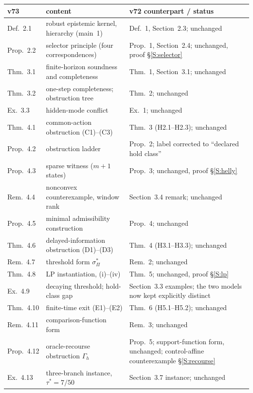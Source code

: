 \documentclass[11pt,a4paper]{article}
\theoremstyle{plain}
\theoremstyle{definition}
\theoremstyle{remark}
\newcommand{\hyp}[1]{\textup{(#1)}}
\begin{document}
\begin{table}[htbp]
\centering\small
\begin{tabularx}{\textwidth}{@{}l>{\raggedright\arraybackslash}X>{\raggedright\arraybackslash}X@{}}
\toprule
v73 & content & v72 counterpart / status\\
\midrule
Def.~2.1 & robust epistemic kernel, hierarchy (main~1) & Def.~1, Section~2.3; unchanged\\
Prop.~2.2 & selector principle (four correspondences) & Prop.~1, Section~2.4; unchanged, proof \S\ref{S:selector}\\
Thm.~3.1 & finite-horizon soundness and completeness & Thm.~1, Section~3.1; unchanged\\
Thm.~3.2 & one-step completeness; obstruction tree & Thm.~2; unchanged\\
Ex.~3.3 & hidden-mode conflict & Ex.~1; unchanged\\
Thm.~4.1 & common-action obstruction \hyp{C1}--\hyp{C3} & Thm.~3 (H2.1--H2.3); unchanged\\
Prop.~4.2 & obstruction ladder & Prop.~2; label corrected to ``declared hold class''\\
Prop.~4.3 & sparse witness ($m{+}1$ states) & Prop.~3; unchanged, proof \S\ref{S:helly}\\
Rem.~4.4 & nonconvex counterexample, window rank & Section~3.4 remark; unchanged\\
Prop.~4.5 & minimal admissibility construction & Prop.~4; unchanged\\
Thm.~4.6 & delayed-information obstruction \hyp{D1}--\hyp{D3} & Thm.~4 (H3.1--H3.3); unchanged\\
Rem.~4.7 & threshold form $\sigma^*_\Pi$ & Rem.~2; unchanged\\
Thm.~4.8 & LP instantiation, (i)--(iv) & Thm.~5; unchanged, proof \S\ref{S:lp}\\
Ex.~4.9 & decaying threshold; hold-class gap & Section~3.3 examples; the two models now kept explicitly distinct\\
Thm.~4.10 & finite-time exit \hyp{E1}--\hyp{E2} & Thm.~6 (H5.1--H5.2); unchanged\\
Rem.~4.11 & comparison-function form & Rem.~3; unchanged\\
Prop.~4.12 & oracle-recourse obstruction $\Gamma_h$ & Prop.~5; support-function form, unchanged; control-affine counterexample \S\ref{S:recourse}\\
Ex.~4.13 & three-branch instance, $\tau^*=7/50$ & Section~3.7 instance; unchanged\\

\end{tabularx}
\end{table}
\end{document}
